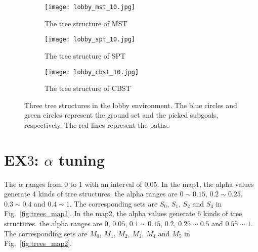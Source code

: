 \begin{figure}[htbp]
 \begin{center}
\begin{subfigure}{.45\textwidth}
  \centering
  \texttt{[image: lobby\_mst\_10.jpg]}
  \caption{The tree structure of MST}
\end{subfigure}
\begin{subfigure}{.45\textwidth}
  \centering
  \texttt{[image: lobby\_spt\_10.jpg]}
  \caption{The tree structure of SPT}
\end{subfigure}
\begin{subfigure}{.45\textwidth}
  \centering
  \texttt{[image: lobby\_cbst\_10.jpg]}
  \caption{The tree structure of CBST}
\end{subfigure}
\caption{Three tree structures in the lobby environment.
The blue circles and green circles represent the ground set and the picked subgoals, respectively.
The red lines represent the paths. }
\label{fig:TSG_lobby}
 \end{center}
 \end{figure}








\section{EX$3$: $\alpha$ tuning}
The $\alpha$ ranges from $0$ to $1$ with an interval of $0.05$.
In the map1, the alpha values generate 4 kinds of tree structures.
the alpha ranges are $0\sim 0.15$, $0.2\sim 0.25$, $0.3\sim 0.4$ and $0.4\sim 1$.
The corresponding sets are $S_0$, $S_1$, $S_2$ and $S_3$ in Fig.~\ref{fig:trees_map1}.
In the map2, the alpha values generate 6 kinds of tree structures.
the alpha ranges are $0$, $0.05$, $0.1\sim 0.15$, $0.2$, $0.25\sim 0.5$ and $0.55\sim 1$.
The corresponding sets are $M_0$, $M_1$, $M_2$, $M_3$, $M_4$ and $M_5$ in Fig.~\ref{fig:trees_map2}.

